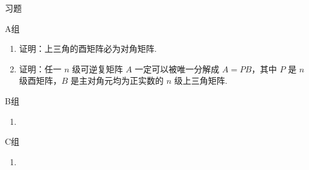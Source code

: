 \vspace{2ex}
\centerline{\heiti \Large 习题}

\vspace{2ex}
{\kaishu }
\begin{flushright}
    \kaishu

\end{flushright}

\centerline{\heiti A组}
\begin{enumerate}
    \item 证明：上三角的酉矩阵必为对角矩阵.

    \item 证明：任一 $ n $ 级可逆复矩阵 $ A $ 一定可以被唯一分解成 $ A = PB $，其中 $ P $ 是 $ n $ 级酉矩阵，$ B $ 是主对角元均为正实数的 $ n $ 级上三角矩阵.
\end{enumerate}

\centerline{\heiti B组}
\begin{enumerate}
    \item
\end{enumerate}

\centerline{\heiti C组}
\begin{enumerate}
    \item
\end{enumerate}

